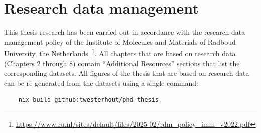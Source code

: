 \openright\chapter{Research data management}

This thesis research has been carried out in accordance with the research data management policy of the Institute of Molecules and Materials of Radboud University, the Netherlands~\footnote{\url{https://www.ru.nl/sites/default/files/2025-02/rdm_policy_imm_v2022.pdf}}.
All chapters that are based on research data (Chapters 2 through 8) contain ``Additional Resources'' sections that list the corresponding datasets. All figures of the thesis that are based on research data can be re-generated from the datasets using a single command:
\begin{verbatim}
    nix build github:twesterhout/phd-thesis
\end{verbatim}
